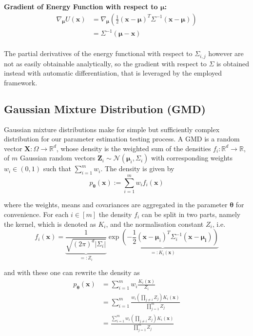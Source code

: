 \textbf{Gradient of Energy Function with respect to $\bm{\mu}$:}
\[
\begin{aligned}
	\nabla_{\bm{\mu}} U(\bm{x}) &= \nabla_{\bm{\mu}} \left( \frac{1}{2} (\bm{x} - \bm{\mu})^T \Sigma^{-1} (\bm{x} - \bm{\mu}) \right) \\
	&= \Sigma^{-1} (\bm{\mu} - \bm{x}) \\
\end{aligned}
\]

The partial derivatives of the energy functional with respect to $\Sigma_{i,j}$ however are not as easily obtainable analytically,
so the gradient with respect to $\Sigma$ is obtained instead with automatic differentiation, that is leveraged by the employed framework.


\subsection{Gaussian Mixture Distribution (GMD)}

Gaussian mixture distributions make for simple but sufficiently complex distribution for our parameter estimation testing process.
A GMD is a random vector  $\bm{X} : \Omega \to \mathbb{R}^d$, whose density is the weighted sum of the densities $f_i : \mathbb{R}^d \to \mathbb{R}$, 
of $m$ Gaussian random vectors $\bm{Z}_i \sim \mathcal{N}(\bm{\mu}_i , \Sigma_i )$ with corresponding weights $w_i \in (0, 1)$ such that $\sum_{i = 1}^m w_i$.
The density is given by
\[
	p_{\bm{\theta}} (\bm{x}) := \sum_{i = 1}^m w_i f_i(\bm{x})
\]

where the weights, means and covariances are aggregated in the parameter $\bm{\theta}$ for convenience.
For each $i \in [m]$ the density $f_i$ can be split in two parts, namely the kernel, which is denoted as $K_i$, and the normalisation constant $Z_i$, i.e.
\[
	f_i (\bm{x}) 
	= \underbrace{ \frac{1}{\sqrt{(2\pi)^{d} |\Sigma_i |}} }_{=: Z_i} 
	\underbrace{ \exp \left( - \frac{1}{2} (\bm{x} - \bm{\mu}_i)^T \Sigma_i^{-1} (\bm{x} - \bm{\mu_i}) \right) }_{=: K_i (\bm{x})}
\]

and with these one can rewrite the density as
\[
\begin{aligned}
	p_{\bm{\theta}} (\bm{x}) 
	&= \sum_{i = 1}^m w_i \frac{K_i(\bm{x})}{Z_i} \\
	&= \sum_{i = 1}^m \frac{ w_i (\prod_{j \neq i} Z_j ) K_i(\bm{x}) }{ \prod_{j = 1}^m Z_j } \\
	&= \frac{ \sum_{i = 1}^m w_i (\prod_{j \neq i} Z_j ) K_i(\bm{x}) }{ \prod_{j = 1}^m Z_j } \\
\end{aligned}
\]

